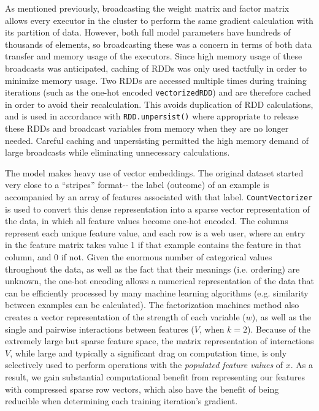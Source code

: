 \documentclass[11pt]{article}
\begin{document}
As mentioned previously, broadcasting the weight matrix and factor
matrix allows every executor in the cluster to perform the same gradient
calculation with its partition of data. However, both full model
parameters have hundreds of thousands of elements, so broadcasting these
was a concern in terms of both data transfer and memory usage of the
executors. Since high memory usage of these broadcasts was anticipated,
caching of RDDs was only used tactfully in order to minimize memory
usage. Two RDDs are accessed multiple times during training iterations
(such as the one-hot encoded \texttt{vectorizedRDD}) and are therefore
cached in order to avoid their recalculation. This avoids duplication of
RDD calculations, and is used in accordance with
\texttt{RDD.unpersist()} where appropriate to release these RDDs and
broadcast variables from memory when they are no longer needed. Careful
caching and unpersisting permitted the high memory demand of large
broadcasts while eliminating unnecessary calculations.

The model makes heavy use of vector embeddings. The original dataset
started very close to a ``stripes'' format-\/- the label (outcome) of an
example is accompanied by an array of features associated with that
label. \texttt{CountVectorizer} is used to convert this dense
representation into a sparse vector representation of the data, in which
all feature values become one-hot encoded. The columns represent each
unique feature value, and each row is a web user, where an entry in the
feature matrix takes value 1 if that example contains the feature in
that column, and 0 if not. Given the enormous number of categorical
values throughout the data, as well as the fact that their meanings
(i.e. ordering) are unknown, the one-hot encoding allows a numerical
representation of the data that can be efficiently processed by many
machine learning algorithms (e.g. similarity between examples can be
calculated). The factorization machines method also creates a vector
representation of the strength of each variable (\(w\)), as well as the
single and pairwise interactions between features (\(V\), when \(k=2\)).
Because of the extremely large but sparse feature space, the matrix
representation of interactions \(V\), while large and typically a
significant drag on computation time, is only selectively used to
perform operations with the \emph{populated feature values} of \(x\). As
a result, we gain substantial computational benefit from representing
our features with compressed sparse row vectors, which also have the
benefit of being reducible when determining each training iteration's
gradient.
\end{document}
